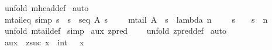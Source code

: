 \begin{isabellebody}
%
\isadelimproof
%
\endisadelimproof
%
\isatagproof
{}\isamarkupfalse%
\ {\isacharparenleft}unfold\ mhead{\isacharunderscore}def{\isacharparenright}\isanewline
{}\isamarkupfalse%
\ auto\isanewline
{}\isamarkupfalse%
%
\endisatagproof
{\isafoldproof}%
%
\isadelimproof
\isanewline
%
\endisadelimproof
\isanewline
\isanewline
{}\isamarkupfalse%
\ mtail{\isacharunderscore}eq\ {\isacharbrackleft}simp{\isacharbrackright}{\isacharcolon}\ {\isachardoublequoteopen}{\isacharbang}{\isacharbang}s{\isachardot}\ {\isacharbrackleft}{\isacharbar}\ s\ {\isacharcolon}\ seq\ A{\isacharsemicolon}\ s\ {\isachartilde}{\isacharequal}\ {\isacharpercent}{\isacharless}{\isacharpercent}{\isachargreater}\ {\isacharbar}{\isacharbrackright}\ {\isacharequal}{\isacharequal}{\isachargreater}\ mtail\ A\ {\isacharpercent}{\isacharcircum}\ s\ {\isacharequal}\ {\isacharparenleft}lambda\ n\ {\isacharcolon}\ {\isacharparenleft}{}\ {\isachardot}{\isachardot}\ {\isacharparenleft}{\isacharparenleft}{\isacharhash}\ s{\isacharparenright}\ {\isacharminus}\ {\isacharparenleft}{}{\isacharparenright}{\isacharparenright}{\isacharparenright}\ {\isachardot}\ s\ {\isacharpercent}{\isacharcircum}\ {\isacharparenleft}n\ {\isacharplus}\ {}{\isacharparenright}{\isacharparenright}{\isachardoublequoteclose}\isanewline
%
\isadelimproof
%
\endisadelimproof
%
\isatagproof
{}\isamarkupfalse%
\ {\isacharparenleft}unfold\ mtail{\isacharunderscore}def{\isacharparenright}\isanewline
{}\isamarkupfalse%
\ {\isacharparenleft}simp{\isacharparenright}\isanewline
{}\isamarkupfalse%
%
\endisatagproof
{\isafoldproof}%
%
\isadelimproof
\isanewline
%
\endisadelimproof
\isanewline
\isanewline
{}\isamarkupfalse%
\ aux{\isacharcolon}\ {\isachardoublequoteopen}zpred\ {}\ {\isacharequal}\ {}{\isachardoublequoteclose}\isanewline
%
\isadelimproof
%
\endisadelimproof
%
\isatagproof
{}\isamarkupfalse%
\ {\isacharparenleft}unfold\ zpred{\isacharunderscore}def{\isacharparenright}\isanewline
{}\isamarkupfalse%
\ auto\isanewline
{}\isamarkupfalse%
%
\endisatagproof
{\isafoldproof}%
%
\isadelimproof
\isanewline
%
\endisadelimproof
\isanewline
\isanewline
{}\isamarkupfalse%
\ aux{}{\isacharcolon}\ {\isachardoublequoteopen}\ zsuc\ {\isacharparenleft}x\ {\isacharminus}\ int\ {}{\isacharparenright}\ {\isacharequal}\ x{\isachardoublequoteclose}\isanewline
%
\isadelimproof
%
\endisadelimproof

\end{isabellebody}
